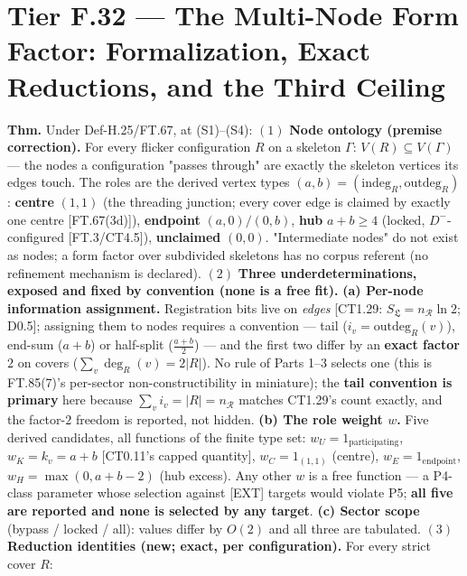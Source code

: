 \section[Tier F.32 — The Multi-Node Form Factor: Formalization,…]{\texorpdfstring{Tier F.32 — The Multi-Node Form Factor: Formalization, Exact Reductions, and the Third Ceiling}{Tier F.32 - The Multi-Node Form Factor: Formalization, Exact Reductions, and the Third Ceiling}}

\begin{theorem}\label{tag:FT-97}
\textbf{Thm.} Under Def-H.25/FT.67, at (S1)–(S4): $(1)$ \textbf{Node ontology (premise correction).} For every flicker configuration $R$ on a skeleton $\Gamma$: $V(R)\subseteq V(\Gamma)$ — the nodes a configuration "passes through" are exactly the skeleton vertices its edges touch. The roles are the derived vertex types $(a,b)=(\mathrm{indeg}_R,\mathrm{outdeg}_R)$: \textbf{centre} $(1,1)$ (the threading junction; every cover edge is claimed by exactly one centre [FT.67(3d)]), \textbf{endpoint} $(a,0)/(0,b)$, \textbf{hub} $a+b\ge4$ (locked, $D^-$-configured [FT.3/CT4.5]), \textbf{unclaimed} $(0,0)$. "Intermediate nodes" do not exist as nodes; a form factor over subdivided skeletons has no corpus referent (no refinement mechanism is declared). $(2)$ \textbf{Three underdeterminations, exposed and fixed by convention (none is a free fit).} \textbf{(a) Per-node information assignment.} Registration bits live on \textit{edges} [CT1.29: $S_{\mathfrak L}=n_{\mathcal R}\ln2$; D0.5]; assigning them to nodes requires a convention — tail ($i_v=\mathrm{outdeg}_R(v)$), end-sum ($a{+}b$) or half-split ($\tfrac{a+b}{2}$) — and the first two differ by an \textbf{exact factor $2$} on covers ($\sum_v\deg_R(v)=2|R|$). No rule of Parts 1–3 selects one (this is FT.85(7)'s per-sector non-constructibility in miniature); the \textbf{tail convention is primary} here because $\sum_v i_v=|R|=n_{\mathcal R}$ matches CT1.29's count exactly, and the factor-$2$ freedom is reported, not hidden. \textbf{(b) The role weight $w$.} Five derived candidates, all functions of the finite type set: $w_U=1_{\mathrm{participating}}$, $w_K=k_v=a{+}b$ [CT0.11's capped quantity], $w_C=1_{(1,1)}$ (centre), $w_E=1_{\mathrm{endpoint}}$, $w_H=\max(0,a{+}b{-}2)$ (hub excess). Any other $w$ is a free function — a P4-class parameter whose selection against [EXT] targets would violate P5; \textbf{all five are reported and none is selected by any target}. \textbf{(c) Sector scope} (bypass / locked / all): values differ by $O(2)$ and all three are tabulated. $(3)$ \textbf{Reduction identities (new; exact, per configuration).} For every strict cover $R$:


\end{theorem}
